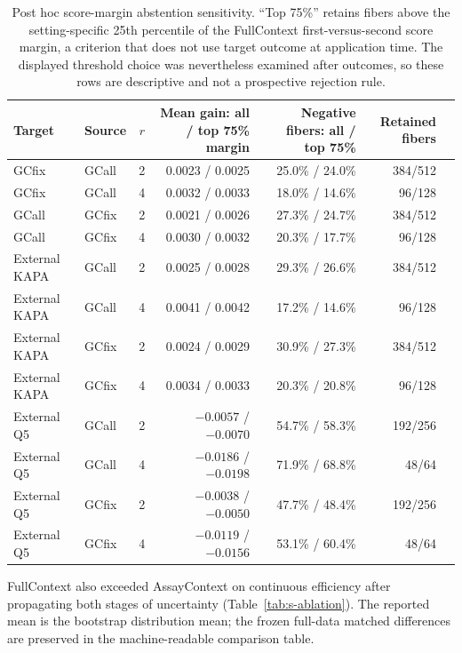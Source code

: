 \documentclass[10pt]{article}
\begin{document}
\begin{table}[H]
\centering
\scriptsize
\begin{tabular}{llrrrrr}
\toprule
Target & Source & $r$ & Mean gain: all / top 75\% margin & Negative fibers: all / top 75\% & Retained fibers\\
\midrule
GCfix & GCall & 2 & 0.0023 / 0.0025 & 25.0\% / 24.0\% & 384/512\\
GCfix & GCall & 4 & 0.0032 / 0.0033 & 18.0\% / 14.6\% & 96/128\\
GCall & GCfix & 2 & 0.0021 / 0.0026 & 27.3\% / 24.7\% & 384/512\\
GCall & GCfix & 4 & 0.0030 / 0.0032 & 20.3\% / 17.7\% & 96/128\\
External KAPA & GCall & 2 & 0.0025 / 0.0028 & 29.3\% / 26.6\% & 384/512\\
External KAPA & GCall & 4 & 0.0041 / 0.0042 & 17.2\% / 14.6\% & 96/128\\
External KAPA & GCfix & 2 & 0.0024 / 0.0029 & 30.9\% / 27.3\% & 384/512\\
External KAPA & GCfix & 4 & 0.0034 / 0.0033 & 20.3\% / 20.8\% & 96/128\\
External Q5 & GCall & 2 & $-0.0057$ / $-0.0070$ & 54.7\% / 58.3\% & 192/256\\
External Q5 & GCall & 4 & $-0.0186$ / $-0.0198$ & 71.9\% / 68.8\% & 48/64\\
External Q5 & GCfix & 2 & $-0.0038$ / $-0.0050$ & 47.7\% / 48.4\% & 192/256\\
External Q5 & GCfix & 4 & $-0.0119$ / $-0.0156$ & 53.1\% / 60.4\% & 48/64\\
\bottomrule
\end{tabular}
\caption{Post hoc score-margin abstention sensitivity. ``Top 75\%'' retains fibers above the setting-specific 25th percentile of the FullContext first-versus-second score margin, a criterion that does not use target outcome at application time. The displayed threshold choice was nevertheless examined after outcomes, so these rows are descriptive and not a prospective rejection rule.}
\label{tab:s-abstention}
\end{table}

FullContext also exceeded AssayContext on continuous efficiency after propagating both stages of uncertainty (Table~\ref{tab:s-ablation}). The reported mean is the bootstrap distribution mean; the frozen full-data matched differences are preserved in the machine-readable comparison table.
\end{document}
